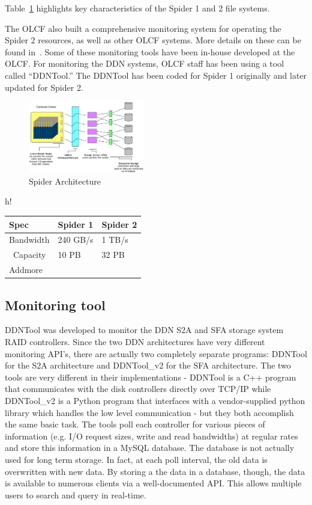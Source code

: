 Table~\ref{table:spider12} highlights key characteristics of the Spider 1 and 2 file systems.

The OLCF also built a comprehensive monitoring system for operating the Spider
2 resources, as well as other OLCF systems. More details on these can be found
in~\cite{olcf-monitoring}. Some of these monitoring tools have been in-house
developed at the OLCF. For monitoring the DDN systems, OLCF staff has been
using a tool called ``DDNTool.'' The DDNTool has been coded for Spider 1
originally and later updated for Spider 2.  


\begin{figure}[!t]
\centering
\includegraphics[width=0.45\textwidth]{./figs/spider2arch.ps}
\vspace{-0.1in}
\centering
\caption{Spider Architecture}
\label{fig:arch}
\end{figure}

\begin{table}{h!}
\begin{center}
\begin{tabular}{l||l|l}
 Spec & Spider 1 & Spider 2\\
\hline
Bandwidth & 240 GB/s & 1 TB/s \\
\
Capacity & 10 PB & 32 PB \\
Addmore \\
\end{tabular}
\end{center}
\label{table:spider12}
\end{table}


\subsection{Monitoring tool}
DDNTool \cite{ddntool10:ross} was developed to monitor the DDN S2A and SFA storage system RAID controllers. Since the two DDN architectures have very different monitoring API's, there are actually two completely separate programs:  DDNTool for the S2A architecture and DDNTool\_v2 for the SFA architecture.  The two tools are very different in their implementations - DDNTool is a C++ program that communicates with the disk controllers directly over TCP/IP while DDNTool\_v2 is a Python program that interfaces with a vendor-supplied python library which handles the low level communication - but they both accomplish the same basic task.  The tools poll each controller for various pieces of information (e.g. I/O request sizes, write and read bandwidths) at regular rates and store this information in a MySQL database.  The database is not actually used for long term storage.  In fact, at each poll interval, the old data is overwritten with new data.  By storing a the data in a database, though, the data is available to numerous clients via a well-documented API.  This allows multiple users to search and query in real-time.

